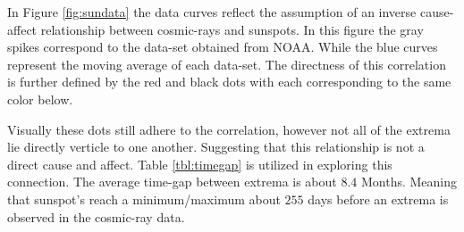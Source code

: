 In Figure \ref{fig:sundata} the data curves reflect the assumption of an
inverse cause-affect relationship between cosmic-rays and sunspots.
In this figure the gray spikes correspond to the data-set obtained
from NOAA. While the blue curves represent the moving average of each data-set.
The directness of this correlation is further defined by the red and black
dots with each corresponding to the same color below.
\par Visually these dots still adhere to the correlation, however not all of
the extrema lie directly verticle to one another. Suggesting that this 
relationship is not a direct cause and affect. Table \ref{tbl:timegap} is 
utilized in exploring this connection. The average time-gap between extrema
is about $8.4$ Months. Meaning that sunspot's reach a minimum/maximum about
$255$ days before an extrema is observed in the cosmic-ray data.
